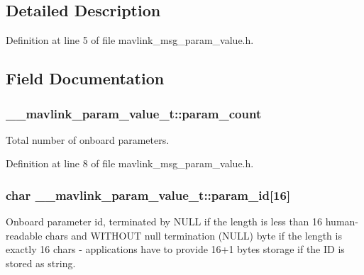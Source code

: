 \subsection{Detailed Description}


Definition at line 5 of file mavlink\-\_\-msg\-\_\-param\-\_\-value.\-h.



\subsection{Field Documentation}
\hypertarget{struct____mavlink__param__value__t_ab53bec8370ac590fc761b9a9de49f6b6}{
\subsubsection[{param\-\_\-count}]{ \-\_\-\-\_\-mavlink\-\_\-param\-\_\-value\-\_\-t\-::param\-\_\-count}}\label{struct____mavlink__param__value__t_ab53bec8370ac590fc761b9a9de49f6b6}


Total number of onboard parameters. 



Definition at line 8 of file mavlink\-\_\-msg\-\_\-param\-\_\-value.\-h.

\hypertarget{struct____mavlink__param__value__t_af686385ecc22c23ab4e2b5d115838119}{
\subsubsection[{param\-\_\-id}]{\setlength{\rightskip}{0pt plus 5cm}char \-\_\-\-\_\-mavlink\-\_\-param\-\_\-value\-\_\-t\-::param\-\_\-id\mbox{[}16\mbox{]}}}\label{struct____mavlink__param__value__t_af686385ecc22c23ab4e2b5d115838119}


Onboard parameter id, terminated by N\-U\-L\-L if the length is less than 16 human-\/readable chars and W\-I\-T\-H\-O\-U\-T null termination (N\-U\-L\-L) byte if the length is exactly 16 chars -\/ applications have to provide 16+1 bytes storage if the I\-D is stored as string. 



